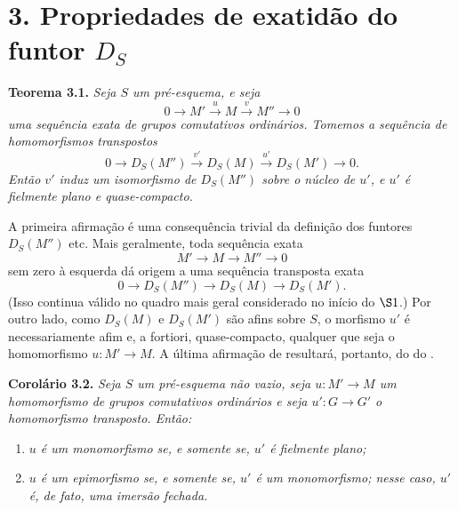 
\section*{3. Propriedades de exatidão do funtor
\texorpdfstring{\(D_S\)}{D\_S}}

\medskip
\noindent{}\textbf{Teorema 3.1.}
\textit{Seja \(S\) um pré-esquema, e seja}
\[
  0\longrightarrow M'
   \xrightarrow{u}M
   \xrightarrow{v}M''
   \longrightarrow0
\]
\textit{uma sequência exata de grupos comutativos ordinários. Tomemos
a sequência de homomorfismos transpostos}
\[
  0\longrightarrow D_S(M'')
   \xrightarrow{v'}D_S(M)
   \xrightarrow{u'}D_S(M')
   \longrightarrow0.
\]
\textit{Então \(v'\) induz um isomorfismo de \(D_S(M'')\) sobre o núcleo de
\(u'\), e \(u'\) é fielmente plano e quase-compacto.}

A primeira afirmação é uma consequência trivial da definição dos
funtores \(D_S(M'')\) etc. Mais geralmente,
toda sequência exata
\[
  M'\longrightarrow M\longrightarrow M''\longrightarrow0
\]
sem zero à esquerda dá origem a uma sequência transposta exata
\[
  0\longrightarrow D_S(M'')
   \longrightarrow D_S(M)
   \longrightarrow D_S(M').
\]
(Isso continua válido no quadro mais geral considerado no início
do \(\SGARefLink{sga3:viii:section:1}{\S1}\).) Por outro lado, como
\(D_S(M)\) e \(D_S(M')\) são afins sobre \(S\), o morfismo \(u'\) é
necessariamente afim e, a fortiori, quase-compacto, qualquer que seja o
homomorfismo \(u:M'\to M\). A última afirmação de
 resultará, portanto,
do  do
.

\medskip
\noindent{}\textbf{Corolário 3.2.}
\textit{Seja \(S\) um pré-esquema não vazio, seja \(u:M'\to M\) um
homomorfismo de grupos comutativos ordinários e seja \(u':G\to G'\) o
homomorfismo transposto. Então:}
\begin{enumerate}
  \item[(a)]
  \textit{\(u\) é um monomorfismo se, e somente se, \(u'\) é fielmente plano;}

  \item[(b)]
  \textit{\(u\) é um epimorfismo se, e somente se, \(u'\) é um
  monomorfismo; nesse caso, \(u'\) é, de fato, uma imersão fechada.}
\end{enumerate}

